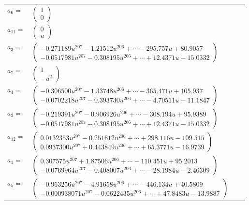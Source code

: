 \documentclass[1p]{elsarticle_modified}
\theoremstyle{definition}
\begin{document}
\begin{tabular}{m{7pt} m{180pt} m{7pt} m{180pt} }
\flushright $a_{6}=$&$\begin{pmatrix}1\\0\end{pmatrix}$ \\
\flushright $a_{11}=$&$\begin{pmatrix}0\\u\end{pmatrix}$ \\
\flushright $a_{3}=$&$\begin{pmatrix}-0.271189 u^{207}-1.21512 u^{206}+\cdots-295.757 u+80.9057\\-0.0517981 u^{207}-0.308195 u^{206}+\cdots+12.4371 u-15.0332\end{pmatrix}$ \\
\flushright $a_{7}=$&$\begin{pmatrix}1\\- u^2\end{pmatrix}$ \\
\flushright $a_{4}=$&$\begin{pmatrix}-0.306500 u^{207}-1.33748 u^{206}+\cdots-365.471 u+105.937\\-0.0702218 u^{207}-0.393730 u^{206}+\cdots-4.70511 u-11.1847\end{pmatrix}$ \\
\flushright $a_{2}=$&$\begin{pmatrix}-0.219391 u^{207}-0.906926 u^{206}+\cdots-308.194 u+95.9389\\-0.0517981 u^{207}-0.308195 u^{206}+\cdots+12.4371 u-15.0332\end{pmatrix}$ \\
\flushright $a_{12}=$&$\begin{pmatrix}0.0132353 u^{207}-0.251612 u^{206}+\cdots+298.116 u-109.515\\0.0937300 u^{207}+0.443849 u^{206}+\cdots+65.3771 u-16.9739\end{pmatrix}$ \\
\flushright $a_{1}=$&$\begin{pmatrix}0.307575 u^{207}+1.87506 u^{206}+\cdots-110.451 u+95.2013\\-0.0769964 u^{207}-0.408007 u^{206}+\cdots-28.1984 u-2.46309\end{pmatrix}$ \\
\flushright $a_{5}=$&$\begin{pmatrix}-0.963256 u^{207}-4.91658 u^{206}+\cdots-446.134 u+40.5809\\-0.000938071 u^{207}-0.0622435 u^{206}+\cdots+47.8483 u-13.9887\end{pmatrix}$ \\

\end{tabular}
\end{document}
